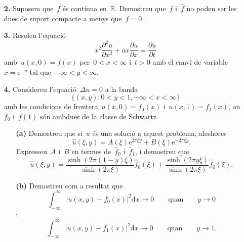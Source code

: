 \documentclass[a4paper]{article}
\theoremstyle{plain}
\theoremstyle{definition}
\newcommand{\e}{\mathrm{e}}
\providecommand{\uppi}{\pi}
\newcommand{\diff}{\mathrm{d}}
\newcommand{\abs}[1]{\lvert{#1}\rvert}
\newcommand{\RR}{\mathbb{R}}
\begin{document}
\begin{enumerate}
    \item[\textbf{2.}] Suposem que~\(f\) és contínua en~\(\RR\).
        Demostreu que~\(f\) i~\(\widehat{f}\) no poden ser les dues de suport
        compacte a menys que~\(f=0\).
\end{enumerate}

\begin{enumerate}
    \item[\textbf{3.}] Resoleu l'equació
        \[
            x^{2}\frac{\partial^{2}u}{\partial x^{2}}
            + ax\frac{\partial u}{\partial x}
            = \frac{\partial u}{\partial t}
        \]
        amb~\(u(x,0) = f(x)\) per~\(0<x<\infty\) i~\(t>0\) amb el canvi de
        variable~\(x=\e^{-y}\) tal que~\(-\infty<y<\infty\).
\end{enumerate}

\begin{enumerate}
    \item[\textbf{4.}] Considereu l'equació~\(\Delta u=0\) a la banda
        \[
            \{(x,y):0<y<1, -\infty<x<\infty\}
        \]
        amb les condicions de frontera~\(u(x,0)=f_{0}(x)\)
        i~\(u(x,1)=f_{1}(x)\), on~\(f_{0}\) i~\(f(1)\) són ambdues de la classe
        de Schwartz.
        \begin{enumerate}
            \item[\textbf{(a)}] Demostreu que si~\(u\) és una solució a aquest
                problema, aleshores
                \[
                    \widehat{u}(\xi,y) =
                    A(\xi)\e^{2\uppi\xi y}
                    +
                    B(\xi)\e^{-2\uppi\xi y}.
                \]
                Expresseu~\(A\) i~\(B\) en termes de~\(\widehat{f}_{0}\)
                i~\(\widehat{f}_{1}\), i demostreu que
                \[
                    \widehat{u}(\xi,y) =
                    \frac{\sinh(2\uppi(1-y)\xi)}{\sinh(2\uppi\xi)}
                    \widehat{f}_{0}(\xi)
                    +
                    \frac{\sinh(2\uppi y\xi)}{\sinh(2\uppi\xi)}
                    \widehat{f}_{0}(\xi).
                \]
        \end{enumerate}
\end{enumerate}

\begin{enumerate}
    \item[]\begin{enumerate}
        \item[\textbf{(b)}] Demostreu com a resultat que
            \[
                \int_{-\infty}^{\infty}
                \abs{u(x,y) - f_{0}(x)}^{2}
                \diff x
                \to 0
                \qquad\text{quan}\qquad
                y\to 0
            \]
            i
            \[
                \int_{-\infty}^{\infty}
                \abs{u(x,y) - f_{1}(x)}^{2}
                \diff x
                \to 0
                \qquad\text{quan}\qquad
                y\to 1.
            \]
    \end{enumerate}
\end{enumerate}
\end{document}
